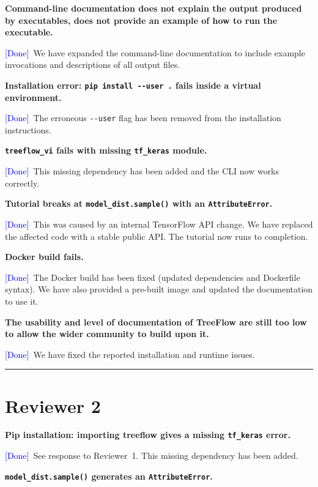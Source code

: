 \documentclass[11pt]{article}
\newcommand{\comment}[1]{\medskip\noindent\textbf{#1}\medskip}
\newcommand{\response}[1]{\noindent #1\medskip}
\newcommand{\done}{\textcolor{blue}{[Done]}}
\begin{document}
\comment{Command-line documentation does not explain the output produced by executables, does not provide an example of how to run the executable.}

\response{\done\ We have expanded the command-line documentation to include example invocations and descriptions of all output files.}

\comment{Installation error: \texttt{pip install -{}-user .} fails inside a virtual environment.}

\response{\done\ The erroneous \texttt{-{}-user} flag has been removed from the installation instructions.}

\comment{\texttt{treeflow\_vi} fails with missing \texttt{tf\_keras} module.}

\response{\done\ This missing dependency has been added and the CLI now works correctly.}

\comment{Tutorial breaks at \texttt{model\_dist.sample()} with an \texttt{AttributeError}.}

\response{\done\ This was caused by an internal TensorFlow API change. We have replaced the affected code with a stable public API. The tutorial now runs to completion.}

\comment{Docker build fails.}

\response{\done\ The Docker build has been fixed (updated dependencies and Dockerfile syntax). We have also provided a pre-built image and updated the documentation to use it.}

\comment{The usability and level of documentation of TreeFlow are still too low to allow the wider community to build upon it.}

\response{\done\ We have fixed the reported installation and runtime issues.}

\bigskip
\hrule
\bigskip

\section*{Reviewer 2}

\comment{Pip installation: importing treeflow gives a missing \texttt{tf\_keras} error.}

\response{\done\ See response to Reviewer~1. This missing dependency has been added.}

\comment{\texttt{model\_dist.sample()} generates an \texttt{AttributeError}.}
\end{document}
